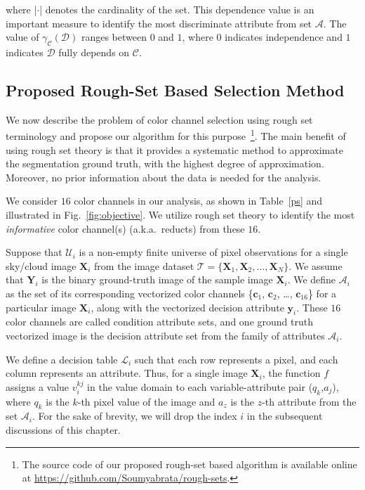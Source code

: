 where |$\cdot$| denotes the cardinality of the set. This dependence value is an important measure to identify the most discriminate attribute from set $\mathcal{A}$. The value of $\gamma_\mathcal{C}(\mathcal{D})$ ranges between $0$ and $1$, where $0$ indicates independence and $1$ indicates $\mathcal{D}$ fully depends on $\mathcal{C}$.


\subsection{Proposed Rough-Set Based Selection Method}
We now describe the problem of color channel selection using rough set terminology and propose our algorithm for this purpose~\footnote{The source code of our proposed rough-set based algorithm is available online at \url{https://github.com/Soumyabrata/rough-sets}.}. The main benefit of using rough set theory is that it provides a systematic method to approximate the segmentation ground truth, with the highest degree of approximation. Moreover, no prior information about the data is needed for the analysis.

We consider $16$ color channels in our analysis, as shown in Table~\ref{ps} and  illustrated in Fig.~\ref{fig:objective}.  We utilize rough set theory to identify the most \emph{informative} color channel(s) (a.k.a.\ reducts) from these $16$. 

Suppose that $\mathcal{U}_i$ is a non-empty finite universe of pixel observations for a single sky/cloud image $\mathbf{X}_i$ from the image dataset $\mathcal{T}=\{\mathbf{X}_1,\mathbf{X}_2, \ldots, \mathbf{X}_N\}$. We assume that $\mathbf{Y}_{i}$ is the binary ground-truth image of the sample image $\mathbf{X}_{i}$. 
We define $\mathcal{A}_i$ as the set of its corresponding vectorized color channels \{$\mathbf{c}_1$, $\mathbf{c}_2$, \ldots, $\mathbf{c}_{16}$\} for a particular image $\mathbf{X}_i$, along with the vectorized decision attribute $\mathbf{y}_i$. These $16$ color channels are called condition attribute sets, and one ground truth vectorized image is the decision attribute set from the family of attributes $\mathcal{A}_i$. 

We define a decision table $\mathcal{L}_i$ such that each row represents a pixel, and each column represents an attribute. 
Thus, for a single image $\mathbf{X}_i$, the function $f$ assigns a value $v_i^{kj}$ in the value domain to each variable-attribute pair ($q_k$,$a_j$), where $q_k$ is the $k$-th pixel value of the image and $a_z$ is the $z$-th attribute from the set $\mathcal{A}_i$. For the sake of brevity, we will drop the index $i$ in the subsequent discussions of this chapter.

